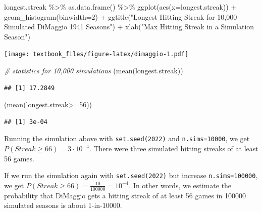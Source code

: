 \documentclass[
  11pt,
]{book}
\newenvironment{Shaded}{\begin{snugshade}}{\end{snugshade}}
\newcommand{\AttributeTok}[1]{\textcolor[rgb]{0.77,0.63,0.00}{#1}}
\newcommand{\CommentTok}[1]{\textcolor[rgb]{0.56,0.35,0.01}{\textit{#1}}}
\newcommand{\DecValTok}[1]{\textcolor[rgb]{0.00,0.00,0.81}{#1}}
\newcommand{\FunctionTok}[1]{\textcolor[rgb]{0.00,0.00,0.00}{#1}}
\newcommand{\NormalTok}[1]{#1}
\newcommand{\SpecialCharTok}[1]{\textcolor[rgb]{0.00,0.00,0.00}{#1}}
\newcommand{\StringTok}[1]{\textcolor[rgb]{0.31,0.60,0.02}{#1}}
\theoremstyle{definition}
\theoremstyle{definition}
\theoremstyle{definition}
\theoremstyle{definition}
\theoremstyle{remark}
\begin{document}
\begin{Shaded}
\begin{Highlighting}[]
\NormalTok{longest.streak }\SpecialCharTok{\%\textgreater{}\%} 
  \FunctionTok{as.data.frame}\NormalTok{() }\SpecialCharTok{\%\textgreater{}\%} 
  \FunctionTok{ggplot}\NormalTok{(}\FunctionTok{aes}\NormalTok{(}\AttributeTok{x=}\NormalTok{longest.streak)) }\SpecialCharTok{+} 
  \FunctionTok{geom\_histogram}\NormalTok{(}\AttributeTok{binwidth=}\DecValTok{2}\NormalTok{) }\SpecialCharTok{+}
  \FunctionTok{ggtitle}\NormalTok{(}\StringTok{"Longest Hitting Streak for 10,000 Simulated DiMaggio 1941 Seasons"}\NormalTok{) }\SpecialCharTok{+}
  \FunctionTok{xlab}\NormalTok{(}\StringTok{"Max Hitting Streak in a Simulation Season"}\NormalTok{)}
\end{Highlighting}
\end{Shaded}

\texttt{[image: textbook\_files/figure-latex/dimaggio-1.pdf]}

\begin{Shaded}
\begin{Highlighting}[]
\CommentTok{\# statistics for 10,000 simulations}
\NormalTok{(}\FunctionTok{mean}\NormalTok{(longest.streak))}
\end{Highlighting}
\end{Shaded}

\begin{verbatim}
## [1] 17.2849
\end{verbatim}

\begin{Shaded}
\begin{Highlighting}[]
\NormalTok{(}\FunctionTok{mean}\NormalTok{(longest.streak}\SpecialCharTok{\textgreater{}=}\DecValTok{56}\NormalTok{))}
\end{Highlighting}
\end{Shaded}

\begin{verbatim}
## [1] 3e-04
\end{verbatim}

Running the simulation above with \texttt{set.seed(2022)} and \texttt{n.sims=10000}, we get \(P(Streak \geq 66) = 3 \cdot 10^{-4}\). There were three simulated hitting streaks of at least 56 games.

If we run the simulation again with \texttt{set.seed(2022)} but increase \texttt{n.sims=100000}, we get \(P(Streak \geq 66) = \frac{10}{100000} = 10^{-4}\). In other words, we estimate the probability that DiMaggio gets a hitting streak of at least 56 games in 100000 simulated seasons is about 1-in-10000.
\end{document}
